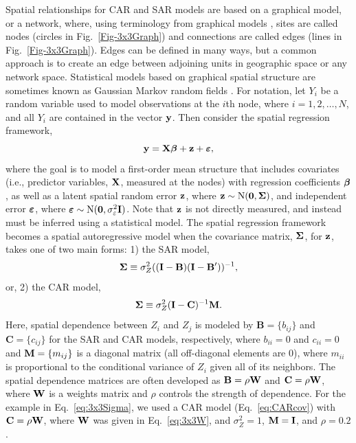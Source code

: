 \documentclass[11pt, titlepage]{article}\usepackage[]{graphicx}\usepackage[]{color}
\begin{document}
\begin{spacing}{1.9}
\begin{flushleft}
Spatial relationships for CAR and SAR models are based on a graphical model, or a network, where, using terminology from graphical models \citep[e.g.,][]{Laur:grap:1996, Whit:grap:2009}, sites are called nodes (circles in Fig.~\ref{Fig-3x3Graph}) and connections are called edges (lines in Fig.~\ref{Fig-3x3Graph}). Edges can be defined in many ways, but a common approach is to create an edge between adjoining units in geographic space or any network space. Statistical models based on graphical spatial structure are sometimes known as Gaussian Markov random fields \citep[e.g.,][]{Rue:Held:Gaus:2005}.  For notation, let $Y_i$ be a random variable used to model observations at the $i$th node, where $i = 1, 2, \dots, N$, and all $Y_i$ are contained in the vector $\mathbf{y}$. Then consider the spatial regression framework, 
\begin{equation}
  \mathbf{y} = \mathbf{X}\mbox{\boldmath $\beta$} + \mathbf{z}  + \mbox{\boldmath $\varepsilon$},
  \label{eq:ArealFramework}
\end{equation}
where the goal is to model a first-order mean structure that includes covariates (i.e., predictor variables, $\mathbf{X}$, measured at the nodes) with regression coefficients $\mbox{\boldmath $\beta$}$, as well as a latent spatial random error $\mathbf{z}$, where $\mathbf{z} \sim \textrm{N}(\mathbf{0},\mbox{\boldmath $\Sigma$})$, and independent error $\mbox{\boldmath $\varepsilon$}$, where $\mbox{\boldmath $\varepsilon$} \sim \textrm{N}(\mathbf{0},\sigma^2_\varepsilon \mathbf{I})$. Note that $\mathbf{z}$ is not directly measured, and instead must be inferred using a statistical model. The spatial regression framework becomes a spatial autoregressive model when the covariance matrix, $\mbox{\boldmath $\Sigma$}$, for $\mathbf{z}$, takes one of two main forms: 1) the SAR model,
\begin{equation} \label{eq:SARcov}
  \mbox{\boldmath $\Sigma$} \equiv \sigma^2_Z ((\mathbf{I}-\mathbf{B})(\mathbf{I}-\mathbf{B}^{\prime}))^{-1},
\end{equation}
or, 2) the CAR model,
\begin{equation} \label{eq:CARcov}
  \mbox{\boldmath $\Sigma$} \equiv \sigma^2_Z (\mathbf{I}-\mathbf{C})^{-1}\mathbf{M}.
\end{equation}
Here, spatial dependence between $Z_i$ and $Z_j$ is modeled by $\mathbf{B} = \{b_{ij}\}$ and $\mathbf{C} = \{c_{ij}\}$ for the SAR and CAR models, respectively, where $b_{ii} = 0$ and $c_{ii} = 0$ and $\mathbf{M} = \{m_{ij}\}$ is a diagonal matrix (all off-diagonal elements are 0), where $m_{ii}$ is proportional to the conditional variance of $Z_i$ given all of its neighbors. The spatial dependence matrices are often developed as $\mathbf{B} = \rho\mathbf{W}$ and $\mathbf{C} = \rho\mathbf{W}$, where $\mathbf{W}$ is a weights matrix and $\rho$ controls the strength of dependence.  For the example in Eq.~\ref{eq:3x3Sigma}, we used a CAR model (Eq.~\ref{eq:CARcov}) with $\mathbf{C} = \rho\mathbf{W}$, where $\mathbf{W}$ was given in Eq.~\ref{eq:3x3W}, and $\sigma^2_Z =1$, $\mathbf{M} = \mathbf{I}$, and $\rho = 0.2$.


\end{flushleft}
\end{spacing}
\end{document}
